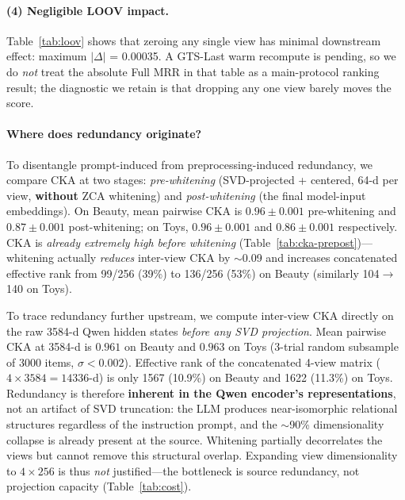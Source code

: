 \documentclass[sigconf,natbib=true,anonymous]{acmart}
\begin{document}
\paragraph{(4) Negligible LOOV impact.}
Table~\ref{tab:loov} shows that zeroing any single view has minimal downstream effect: maximum $|\Delta|$ = 0.00035.
A GTS-Last warm recompute is pending, so we do \emph{not} treat the absolute Full MRR in that table as a main-protocol ranking result; the diagnostic we retain is that dropping any one view barely moves the score.

\paragraph{Where does redundancy originate?}
To disentangle prompt-induced from preprocessing-induced redundancy, we compare CKA at two stages: \emph{pre-whitening} (SVD-projected + centered, 64-d per view, \textbf{without} ZCA whitening) and \emph{post-whitening} (the final model-input embeddings).
On Beauty, mean pairwise CKA is $0.96\pm0.001$ pre-whitening and $0.87\pm0.001$ post-whitening; on Toys, $0.96\pm0.001$ and $0.86\pm0.001$ respectively.
CKA is \emph{already extremely high before whitening} (Table~\ref{tab:cka-prepost})---whitening actually \emph{reduces} inter-view CKA by $\sim$0.09 and increases concatenated effective rank from 99/256 (39\%) to 136/256 (53\%) on Beauty (similarly 104$\to$140 on Toys).

To trace redundancy further upstream, we compute inter-view CKA directly on the raw 3584-d Qwen hidden states \emph{before any SVD projection}.
Mean pairwise CKA at 3584-d is $0.961$ on Beauty and $0.963$ on Toys (3-trial random subsample of 3000 items, $\sigma < 0.002$).
Effective rank of the concatenated 4-view matrix ($4\times 3584 = 14336$-d) is only 1567 (10.9\%) on Beauty and 1622 (11.3\%) on Toys.
Redundancy is therefore \textbf{inherent in the Qwen encoder's representations}, not an artifact of SVD truncation: the LLM produces near-isomorphic relational structures regardless of the instruction prompt, and the $\sim$90\% dimensionality collapse is already present at the source.
Whitening partially decorrelates the views but cannot remove this structural overlap.
Expanding view dimensionality to $4\times256$ is thus \emph{not} justified---the bottleneck is source redundancy, not projection capacity (Table~\ref{tab:cost}).
\end{document}
